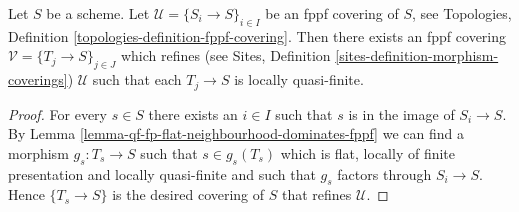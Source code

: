 \begin{lemma}
\label{lemma-qf-fp-flat-dominates-fppf}
Let $S$ be a scheme. Let $\mathcal{U} = \{S_i \to S\}_{i \in I}$ be an fppf
covering of $S$, see
Topologies, Definition \ref{topologies-definition-fppf-covering}.
Then there exists an fppf covering $\mathcal{V} = \{T_j \to S\}_{j \in J}$
which refines (see
Sites, Definition \ref{sites-definition-morphism-coverings})
$\mathcal{U}$ such that each $T_j \to S$ is locally quasi-finite.
\end{lemma}

\begin{proof}
For every $s \in S$ there exists an $i \in I$ such that $s$ is in
the image of $S_i \to S$. By
Lemma \ref{lemma-qf-fp-flat-neighbourhood-dominates-fppf}
we can find a morphism $g_s : T_s \to S$ such that $s \in g_s(T_s)$
which is flat, locally of finite presentation and locally quasi-finite
and such that $g_s$ factors through $S_i \to S$. Hence
$\{T_s \to S\}$ is the desired covering of $S$ that refines $\mathcal{U}$.
\end{proof}
